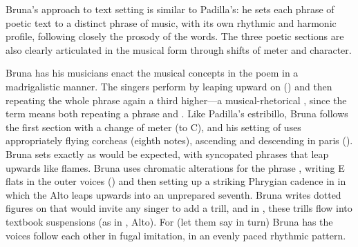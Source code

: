% 	

Bruna's approach to text setting is similar to Padilla's: he sets each phrase of poetic text to a distinct phrase of music, with its own rhythmic and harmonic profile, following closely the prosody of the words.
The three poetic sections are also clearly articulated in the musical form through shifts of meter and character.

Bruna has his musicians enact the musical concepts in the poem in a madrigalistic manner.
The singers perform  by leaping upward on  () and then repeating the whole phrase again a third higher---a musical-rhetorical , since the term means both repeating a phrase and .
Like Padilla's estribillo, Bruna follows the first section with a change of meter (to C), and his setting of  uses appropriately flying corcheas (eighth notes), ascending and descending in paris ().
Bruna sets  exactly as would be expected, with syncopated phrases that leap upwards like flames.
Bruna uses chromatic alterations for the phrase , writing E flats in the outer voices () and then setting up a striking Phrygian cadence in  in which the Alto leaps upwards into an unprepared seventh.
Bruna writes dotted figures on  that would invite any singer to add a trill, and in , these trills flow into textbook suspensions (as in , Alto).
For  (let them say in turn) Bruna has the voices follow each other in fugal imitation, in an evenly paced rhythmic pattern.

% 

